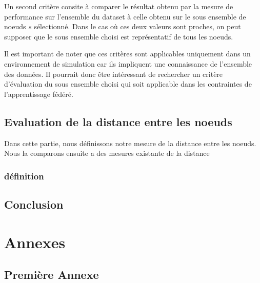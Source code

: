 \documentclass[stage3a]{tnreport} %
\begin{document}
Un second critère consite à comparer le résultat obtenu par la mesure de performance sur l'ensemble du dataset à celle obtenu sur le sous ensemble de noeuds $s$ sélectionné. Dans le cas où ces deux valeurs sont proches, on peut supposer que le sous ensemble choisi est représentatif de tous les noeuds.


Il est important de noter que ces critères sont applicables uniquement dans un environnement de simulation car ils impliquent une connaissance de l'ensemble des données. Il pourrait donc être intéressant de rechercher un critère d'évaluation du sous ensemble choisi qui soit applicable dans les contraintes de l'apprentissage fédéré.


\chapter{Evaluation de la distance entre les noeuds}


Dans cette partie, nous définissons notre mesure de la distance entre les noeuds. Nous la comparons ensuite a des mesures existante de la distance 

\section{définition}


\chapter{Conclusion}

\cleardoublepage

\renewcommand{\tocbibname}{Bibliographie / Webographie}


\cleardoublepage


\listoffigures
\cleardoublepage

\listoftables
\cleardoublepage

\lstlistoflistings
\cleardoublepage

\printglossaries

\cleardoublepage
\renewcommand{\thesubsection}{\Roman{subsection}}

\appendix
\part*{Annexes}
\cleardoublepage

\chapter{Première Annexe}
\cleardoublepage
\end{document}
